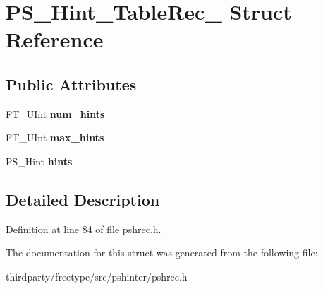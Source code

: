 \hypertarget{struct_p_s___hint___table_rec__}{}\section{P\+S\+\_\+\+Hint\+\_\+\+Table\+Rec\+\_\+ Struct Reference}
\label{struct_p_s___hint___table_rec__}
\subsection*{Public Attributes}
\begin{DoxyCompactItemize}
\item 
\mbox{\label{struct_p_s___hint___table_rec___a5734ff9130879de1e917e86950016ca9}} 
F\+T\+\_\+\+U\+Int {\bfseries num\+\_\+hints}
\item 
\mbox{\label{struct_p_s___hint___table_rec___abc4dd066a89f99a748ad1ed17f4af115}} 
F\+T\+\_\+\+U\+Int {\bfseries max\+\_\+hints}
\item 
\mbox{\label{struct_p_s___hint___table_rec___a131099e446ede3db7dd2756e24ad06bb}} 
P\+S\+\_\+\+Hint {\bfseries hints}
\end{DoxyCompactItemize}


\subsection{Detailed Description}


Definition at line 84 of file pshrec.\+h.



The documentation for this struct was generated from the following file\+:\begin{DoxyCompactItemize}
\item 
thirdparty/freetype/src/pshinter/pshrec.\+h\end{DoxyCompactItemize}
